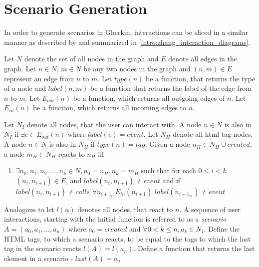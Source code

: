 \section{Scenario Generation}
\label{concept:scenario_generation}
In order to generate scenarios in Gherkin, interactions can be sliced in a similar manner as described by \textcite{zhang2019scenario} and summarized in \ref{intro:zhang_interaction_diagrams}.

Let $N$ denote the set of all nodes in the graph and $E$ denote all edges in the graph. Let $n \in N$, $m \in N$ be any two nodes in the graph and $(n, m) \in E $ represent an edge from $n$ to $m$. Let $type(n)$ be a function, that returns the type of a node and $label(n, m)$ be a function that returns the label of the edge from $n$ to $m$. Let $E_{out}(n)$ be a function, which returns all outgoing edges of $n$.
Let $E_{in}(n)$ be a function, which returns all incoming edges to $n$.

Let $N_I$ denote all nodes, that the user can interact with. A node $n \in N$ is also in $N_I$ if $\exists e \in E_{out}(n)$ where $label(e) = event$. Let $N_H$ denote all html tag nodes. A node $n \in N$ is also in $N_H$ if $type(n) = tag$. 
Given a node $n_H \in N_H \cup {created}$, a node $m_H \in N_H$ reacts to $n_H$ iff
\begin{enumerate}
    \item $\exists n_0,n_1,n_2, \ldots,n_k \in N, n_0=n_H,n_k=m_H$ such that for each $0 \leq i < k  $ $(n_i,n_{i+1}) \in E$, and $label(n_i,n_{i+1})\neq event$ and if $label(n_i,n_{i+1}) \neq calls$ $\forall n_{i+1_{in}} E_{in}(n_{i+1})$ $label(n_{i+1_{in}}) \neq event$ 
\end{enumerate}

Analogous to \cite{zhang2019scenario} let $l(n)$ denotes all nodes, that react to $n$. A sequence of user interactions, starting with the initial function is referred to as a \textit{scenario} $A=(a_0,a_1,\ldots, a_n)$ where $a_0=created$ and $\forall0 < k \leq n, a_k \in N_I$. 
Define the HTML tags, to which a scenario reacts, to be equal to the tags to which the last tag in the scenario reacts $l(A)=l(a_n)$. Define a function that returns the last element in a scenario - $last(A) = a_n$

